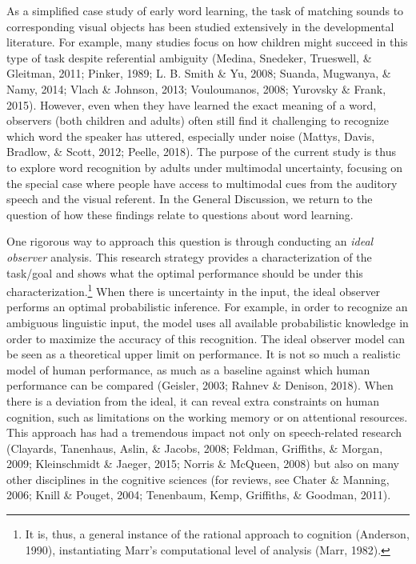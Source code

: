 \documentclass[english,,man,floatsintext]{apa6}
\let\rmarkdownfootnote\footnote%
\def\footnote{\protect\rmarkdownfootnote}
\theoremstyle{definition}
\theoremstyle{definition}
\theoremstyle{definition}
\theoremstyle{remark}
\begin{document}
As a simplified case study of early word learning, the task of matching
sounds to corresponding visual objects has been studied extensively in
the developmental literature. For example, many studies focus on how
children might succeed in this type of task despite referential
ambiguity (Medina, Snedeker, Trueswell, \& Gleitman, 2011; Pinker, 1989;
L. B. Smith \& Yu, 2008; Suanda, Mugwanya, \& Namy, 2014; Vlach \&
Johnson, 2013; Vouloumanos, 2008; Yurovsky \& Frank, 2015). However,
even when they have learned the exact meaning of a word, observers (both
children and adults) often still find it challenging to recognize which
word the speaker has uttered, especially under noise (Mattys, Davis,
Bradlow, \& Scott, 2012; Peelle, 2018). The purpose of the current study
is thus to explore word recognition by adults under multimodal
uncertainty, focusing on the special case where people have access to
multimodal cues from the auditory speech and the visual referent. In the
General Discussion, we return to the question of how these findings
relate to questions about word learning.

One rigorous way to approach this question is through conducting an
\emph{ideal observer} analysis. This research strategy provides a
characterization of the task/goal and shows what the optimal performance
should be under this characterization.\footnote{It is, thus, a general
  instance of the rational approach to cognition (Anderson, 1990),
  instantiating Marr's computational level of analysis (Marr, 1982).}
When there is uncertainty in the input, the ideal observer performs an
optimal probabilistic inference. For example, in order to recognize an
ambiguous linguistic input, the model uses all available probabilistic
knowledge in order to maximize the accuracy of this recognition. The
ideal observer model can be seen as a theoretical upper limit on
performance. It is not so much a realistic model of human performance,
as much as a baseline against which human performance can be compared
(Geisler, 2003; Rahnev \& Denison, 2018). When there is a deviation from
the ideal, it can reveal extra constraints on human cognition, such as
limitations on the working memory or on attentional resources. This
approach has had a tremendous impact not only on speech-related research
(Clayards, Tanenhaus, Aslin, \& Jacobs, 2008; Feldman, Griffiths, \&
Morgan, 2009; Kleinschmidt \& Jaeger, 2015; Norris \& McQueen, 2008) but
also on many other disciplines in the cognitive sciences (for reviews,
see Chater \& Manning, 2006; Knill \& Pouget, 2004; Tenenbaum, Kemp,
Griffiths, \& Goodman, 2011).
\end{document}

